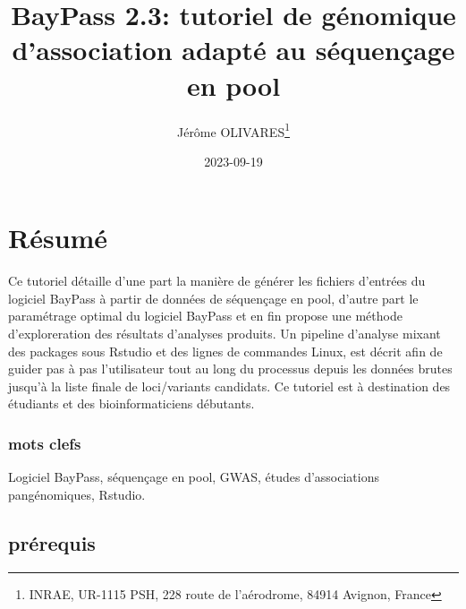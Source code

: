 \documentclass[
  openany]{book}
\title{BayPass 2.3: tutoriel de génomique d'association adapté au séquençage en pool}
\author{Jérôme OLIVARES\footnote{INRAE, UR-1115 PSH, 228 route de l'aérodrome, 84914 Avignon, France}}
\date{2023-09-19}
\theoremstyle{definition}
\theoremstyle{definition}
\theoremstyle{definition}
\theoremstyle{definition}
\theoremstyle{remark}
\begin{document}
\maketitle

{
\hypersetup{linkcolor=}
\setcounter{tocdepth}{1}
\tableofcontents
}
\hypertarget{ruxe9sumuxe9}{%
\chapter*{Résumé}\label{ruxe9sumuxe9}}

Ce tutoriel détaille d'une part la manière de générer les fichiers d'entrées du logiciel BayPass à partir de données de séquençage en pool, d'autre part le paramétrage optimal du logiciel BayPass et en fin propose une méthode d'exploreration des résultats d'analyses produits. Un pipeline d'analyse mixant des packages sous Rstudio et des lignes de commandes Linux, est décrit afin de guider pas à pas l'utilisateur tout au long du processus depuis les données brutes jusqu'à la liste finale de loci/variants candidats.
Ce tutoriel est à destination des étudiants et des bioinformaticiens débutants.

\hypertarget{mots-clefs}{%
\subsection*{mots clefs}\label{mots-clefs}}

Logiciel BayPass, séquençage en pool, GWAS, études d'associations pangénomiques, Rstudio.

\hypertarget{pruxe9requis}{%
\section*{prérequis}\label{pruxe9requis}}
\end{document}
